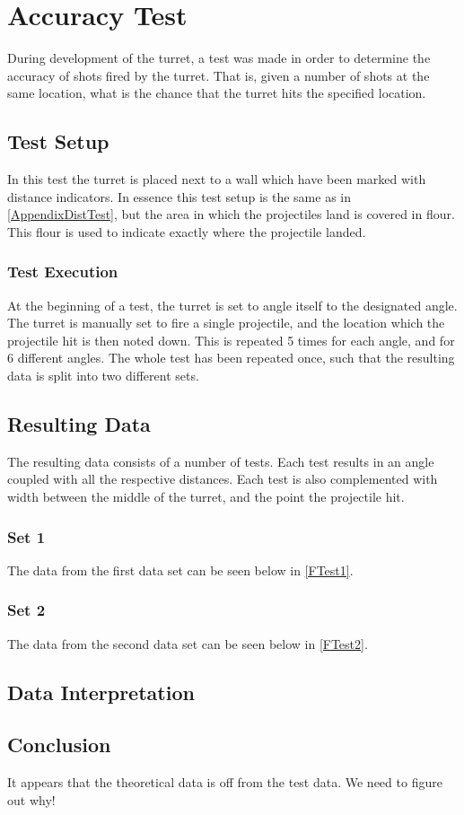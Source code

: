 \chapter{Accuracy Test}\label{AppendixAccTest}
During development of the turret, a test was made in order to determine the
accuracy of shots fired by the turret. That is, given a number of shots at the
same location, what is the chance that the turret hits the specified location.

\section{Test Setup}
In this test the turret is placed next to a wall which have been marked with
distance indicators. In essence this test setup is the same as in
\autoref{AppendixDistTest}, but the area in which the projectiles land is
covered in flour. This flour is used to indicate exactly where the projectile
landed.

\subsection{Test Execution}
At the beginning of a test, the turret is set to angle itself to the designated
angle. The turret is manually set to fire a single projectile, and the location
which the projectile hit is then noted down. This is repeated 5 times for each
angle, and for 6 different angles. The whole test has been repeated once, such
that the resulting data is split into two different sets.

\section{Resulting Data}
The resulting data consists of a number of tests. Each test results in an angle
coupled with all the respective distances. Each test is also complemented with
width between the middle of the turret, and the point the projectile hit.

\subsection{Set 1}
The data from the first data set can be seen below in \autoref{FTest1}. 

\subsection{Set 2}
The data from the second data set can be seen below in \autoref{FTest2}. 

\section{Data Interpretation}


\section{Conclusion}
It appears that the theoretical data is off from the test data. We need to
figure out why!
